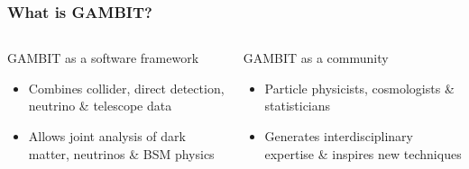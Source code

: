 \documentclass[aspectratio=169]{beamer}
\begin{document}
\begin{frame}
    \frametitle{What is GAMBIT?}
    \begin{columns}
        \begin{block}{GAMBIT as a software framework}
            \begin{itemize}
                \item Combines collider, direct detection, neutrino \& telescope data
                \item Allows joint analysis of dark matter, neutrinos \& BSM physics
            \end{itemize}
        \end{block}
        \begin{block}{GAMBIT as a community}
            \begin{itemize}
                \item Particle physicists, cosmologists \& statisticians
                \item Generates interdisciplinary expertise \& inspires new techniques

            \end{itemize}
        \end{block}
    \end{columns}
%



\end{frame}
\end{document}
